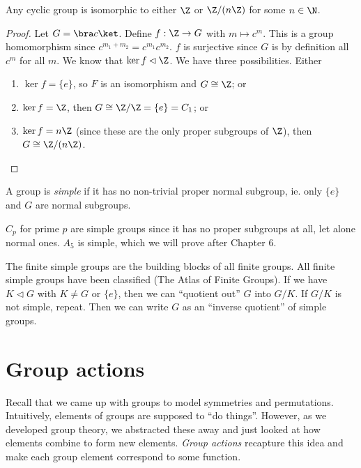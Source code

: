 \documentclass[a4paper]{article}
\begin{document}
\begin{lemma}
  Any cyclic group is isomorphic to either $\Z$ or $\Z/(n\Z)$ for some $n\in \N$.
\end{lemma}

\begin{proof}
  Let $G = \bra c\ket$. Define $f: \Z \to G$ with $m\mapsto c^m$. This is a group homomorphism since $c^{m_1 + m_2} = c^{m_1}c^{m_2}$. $f$ is surjective since $G$ is by definition all $c^m$ for all $m$. We know that $\ker f\lhd \Z$. We have three possibilities. Either
  \begin{enumerate}
    \item $\ker f = \{e\}$, so $F$ is an isomorphism and $G\cong \Z$; or
    \item $\ker f = \Z$, then $G\cong \Z/\Z = \{e\} = C_1$; or
    \item $\ker f = n\Z$ (since these are the only proper subgroups of $\Z$), then $G\cong \Z/(n\Z)$.
  \end{enumerate}
\end{proof}

\begin{defi}
  A group is \emph{simple} if it has no non-trivial proper normal subgroup, ie. only $\{e\}$ and $G$ are normal subgroups.
\end{defi}

\begin{eg}
  $C_p$ for prime $p$ are simple groups since it has no proper subgroups at all, let alone normal ones.
  $A_5$ is simple, which we will prove after Chapter 6.
\end{eg}

The finite simple groups are the building blocks of all finite groups. All finite simple groups have been classified (The Atlas of Finite Groups). If we have $K\lhd G$ with $K\not= G$ or $\{e\}$, then we can ``quotient out'' $G$ into $G/K$. If $G/K$ is not simple, repeat. Then we can write $G$ as an ``inverse quotient'' of simple groups.

\section{Group actions}
\label{sec:action}
Recall that we came up with groups to model symmetries and permutations. Intuitively, elements of groups are supposed to ``do things''. However, as we developed group theory, we abstracted these away and just looked at how elements combine to form new elements. \emph{Group actions} recapture this idea and make each group element correspond to some function.
\end{document}
